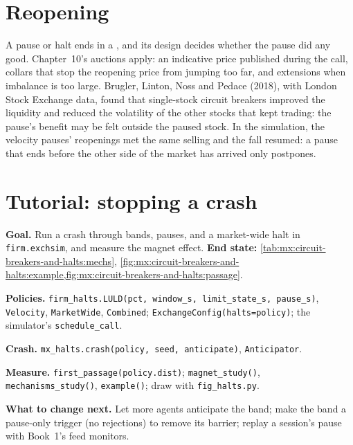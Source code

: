 \section{Reopening}

A pause or halt ends in a , and its design decides whether the pause did any good. Chapter~10's auctions apply: an indicative price
published during the call, collars that stop the reopening price from jumping too far, and extensions when imbalance is too large. Brugler, Linton, Noss
and Pedace (2018), with London Stock Exchange data, found that single-stock circuit breakers improved the liquidity and reduced the volatility of the
other stocks that kept trading: the pause's benefit may be felt outside the paused stock. In the simulation, the velocity pauses' reopenings met the same
selling and the fall resumed: a pause that ends before the other side of the market has arrived only postpones.

\section{Tutorial: stopping a crash}\label{tut:mx:circuit-breakers-and-halts:tut}

\begin{tutorial}
\textbf{Goal.} Run a crash through bands, pauses,  and a market-wide halt in \texttt{firm.exchsim}, and measure the magnet effect.
\textbf{End state:} \cref{tab:mx:circuit-breakers-and-halts:mechs}, \cref{fig:mx:circuit-breakers-and-halts:example,fig:mx:circuit-breakers-and-halts:passage}.
\begin{tutsteps}
\item \textbf{Policies.} \texttt{firm\_halts.LULD(pct, window\_s, limit\_state\_s, pause\_s)}, \texttt{Velocity}, \texttt{MarketWide},
\texttt{Combined}; \texttt{ExchangeConfig(halts=policy)}; the simulator's \texttt{schedule\_call}.
\item \textbf{Crash.} \texttt{mx\_halts.crash(policy, seed, anticipate)}, \texttt{Anticipator}.
\item \textbf{Measure.} \texttt{first\_passage(policy.dist)}; \texttt{magnet\_study()}, \texttt{mechanisms\_study()}, \texttt{example()}; draw with
\texttt{fig\_halts.py}.
\end{tutsteps}
\textbf{What to change next.} Let more agents anticipate the band; make the band a pause-only trigger (no rejections) to remove its barrier; replay a
session's pause with Book~1's feed monitors.
\end{tutorial}

